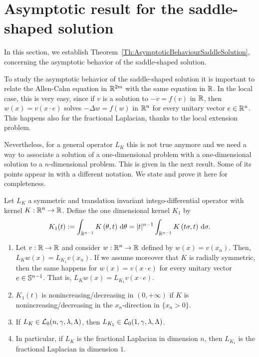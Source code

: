 \section{Asymptotic result for the saddle-shaped solution}
\label{Sec:Asymptotic}

In this section, we establish Theorem~\ref{Th:AsymptoticBehaviourSaddleSolution}, concerning the asymptotic behavior of the saddle-shaped solution. 



To study the asymptotic behavior of the saddle-shaped solution it is important to relate the Allen-Cahn equation in $\mathbb{R}^{2m}$ with the same equation in $\mathbb{R}$. In the local case, this is very easy, since if $v$ is a solution to $-\ddot{v} = f(v)$ in $\mathbb{R}$,  then $w(x) = v(x\cdot e)$ solves $-\Delta w = f(w)$ in $\mathbb{R}^n$ for every unitary vector $e\in \mathbb{R}^n$. This happens also for the fractional Laplacian, thanks to the local extension problem.

Nevertheless, for a general operator $L_K$ this is not true anymore and we need a way to associate a solution of a one-dimensional problem with a one-dimensional solution to a $n$-dimensional problem. This is given in the next result. Some of its points appear in \cite{CozziPassalacqua} with a different notation. We state and prove it here for completeness.

\begin{proposition}
	\label{Prop:KernelsDimension}
	Let $L_K $ a symmetric and translation invariant intego-differential operator with kernel $K:\mathbb{R}^n \to \mathbb{R}$. Define the one dimensional kernel $K_1$ by
	$$ K_1(t) := \int_{\mathbb{R}^{n-1}} K\left(\theta,t\right) \,\mathrm{d} \theta = |t|^{n-1} \int_{\mathbb{R}^{n-1}} K\left(t\sigma,t\right) \,\mathrm{d} \sigma. $$
	\begin{enumerate}[label=(\roman{*})]
		\item Let $v:\mathbb{R}\to\mathbb{R}$ and consider $w:\mathbb{R}^n\to\mathbb{R}$ defined by $w(x) = v(x_n)$. Then, $L_K w(x) = L_{K_1} v(x_n)$. If we assume moreover that $K$ is radially symmetric, then the same happens for $w(x) = v(x\cdot e)$ for every unitary vector $e\in \mathbb{S}^{n-1}$. That is, $L_K w(x) = L_{K_1} v(x \cdot e)$.
		\item $K_1(t)$ is nonincreasing/decreasing in $(0,+\infty)$ if $K$ is nonincreasing/decreasing in  the $x_n$-direction in $\{x_n>0\}$.
		\item If $L_K \in \mathcal{L}_0 (n,\gamma,\lambda,\Lambda)$, then   $L_{K_1} \in \mathcal{L}_0 (1,\gamma,\lambda,\Lambda)$.
		\item In particular, if $L_K $ is the fractional Laplacian in dimension $n$, then $L_{K_1}$ is the fractional Laplacian in dimension $1$.
		
	\end{enumerate}
\end{proposition}

